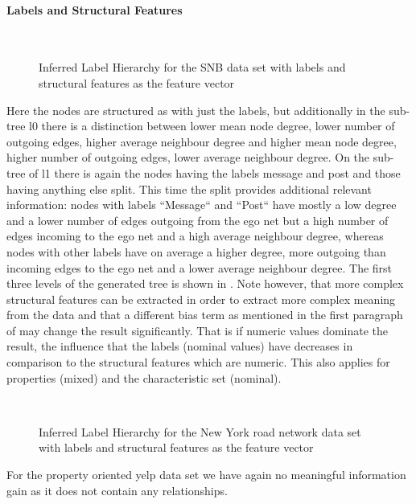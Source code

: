 \paragraph{Labels and Structural Features}
\begin{figure}[htp]
    \centering
     \\
    \caption{Inferred Label Hierarchy for the SNB data set with labels and structural features as the feature vector}
    \label{fig:lsldbctree}
\end{figure}{}
Here the nodes are structured as with just the labels, but additionally in the sub-tree l0 there is a distinction between lower mean node degree, lower number of outgoing edges, higher average neighbour degree and higher mean node degree, higher number of outgoing edges, lower average neighbour degree. On the sub-tree of l1 there is again the nodes having the labels message and post and those having anything else split. This time the split provides additional relevant information: nodes with labels ``Message`` and ``Post`` have mostly a low degree and a lower number of edges outgoing from the ego net but a high number of edges incoming to the ego net and a high average neighbour degree, whereas nodes with other labels have on average a higher degree, more outgoing than incoming edges to the ego net and a lower average neighbour degree. The first three levels of the generated tree is shown in . Note however, that more complex structural features can be extracted in order to extract more complex meaning from the data and that a different bias term as mentioned in the first paragraph of  may change the result significantly. That is if numeric values dominate the result, the influence that the labels (nominal values) have decreases in comparison to the structural features which are numeric. This also applies for properties (mixed) and the characteristic set (nominal). \\

\begin{figure}[htp]
    \centering
     \\
    \caption{Inferred Label Hierarchy for the New York road network data set with labels and structural features as the feature vector}
    \label{fig:lsroadnetnytree}
\end{figure}{}
For the property oriented yelp data set we have again no meaningful information gain as it does not contain any relationships. \\


